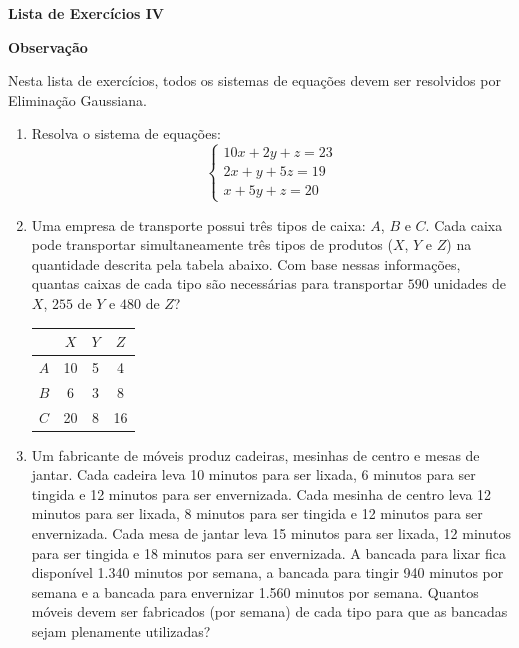 \documentclass[12pt,a4paper]{article}
\begin{document}
\begin{center}
 \textbf{Lista de Exercícios IV}
\end{center}

\begin{flushleft}
 \textbf{Observação}

 Nesta lista de exercícios, todos os sistemas de equações devem ser resolvidos por Eliminação Gaussiana.
\end{flushleft}

\begin{enumerate}
  \item Resolva o sistema de equações:
  $$\begin{cases}10x + 2y + z = 23 \\ 2x + y + 5z = 19 \\ x + 5y + z = 20 \end{cases}$$

  \item Uma empresa de transporte possui três tipos de caixa: $A$, $B$ e
$C$. Cada caixa pode transportar simultaneamente três tipos de produtos
($X$, $Y$ e $Z$) na quantidade descrita pela tabela abaixo. Com
base nessas informações, quantas caixas de cada tipo são necessárias
para transportar $590$ unidades de $X$, $255$ de $Y$ e $480$
de $Z$? \\
\begin{table}[H]
\centering%
\begin{tabular}{|c|c|c|c|}
\cline{2-4} 
\multicolumn{1}{c|}{} & $X$ & $Y$ & $Z$\\
\hline 
$A$ & 10 & 5 & 4\\
\hline 
$B$ & 6 & 3 & 8\\
\hline 
$C$ & 20 & 8 & 16\\
\hline 
\end{tabular}
\end{table}

  \item Um fabricante de móveis produz cadeiras, mesinhas de centro e mesas
de jantar. Cada cadeira leva 10 minutos para ser lixada, 6 minutos
para ser tingida e 12 minutos para ser envernizada. Cada mesinha de
centro leva 12 minutos para ser lixada, 8 minutos para ser tingida
e 12 minutos para ser envernizada. Cada mesa de jantar leva 15 minutos
para ser lixada, 12 minutos para ser tingida e 18 minutos para ser
envernizada. A bancada para lixar fica disponível 1.340 minutos por
semana, a bancada para tingir 940 minutos por semana e a bancada para
envernizar 1.560 minutos por semana. Quantos móveis devem ser fabricados
(por semana) de cada tipo para que as bancadas sejam plenamente utilizadas?


\end{enumerate}
\end{document}
